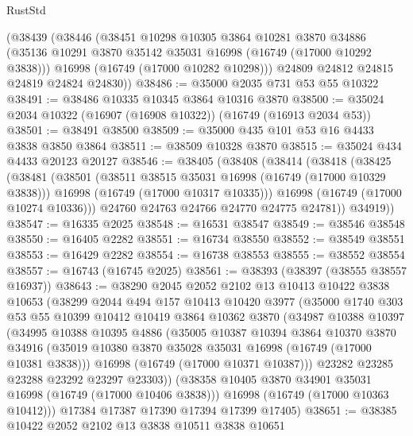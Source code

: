 \begin{lexlean}{RustStd}
\begin{coremodule}
    (@38439
      (@38446
        (@38451
          @10298
          @10305
          @3864
          @10281
          @3870
          @34886
          (@35136 @10291 @3870 @35142 @35031 @16998 (@16749 (@17000 @10292 @3838)))
          @16998
          (@16749 (@17000 @10282 @10298)))
        @24809
        @24812
        @24815
        @24819
        @24824
        @24830))
@38486 := @35000 @2035 @731 @53 @55 @10322
@38491 := @38486 @10335 @10345 @3864 @10316 @3870
@38500 := @35024 @2034 @10322 (@16907 (@16908 @10322)) (@16749 (@16913 @2034 @53))
@38501 := @38491 @38500
@38509 := @35000 @435 @101 @53 @16 @4433 @3838 @3850 @3864
@38511 := @38509 @10328 @3870
@38515 := @35024 @434 @4433 @20123 @20127
@38546 := @38405
    (@38408
      (@38414
        (@38418
          (@38425
            (@38481
              (@38501
                (@38511 @38515 @35031 @16998 (@16749 (@17000 @10329 @3838)))
                @16998
                (@16749 (@17000 @10317 @10335)))
              @16998
              (@16749 (@17000 @10274 @10336)))
            @24760
            @24763
            @24766
            @24770
            @24775
            @24781))
        @34919))
@38547 := @16335 @2025
@38548 := @16531 @38547
@38549 := @38546 @38548
@38550 := @16405 @2282
@38551 := @16734 @38550
@38552 := @38549 @38551
@38553 := @16429 @2282
@38554 := @16738 @38553
@38555 := @38552 @38554
@38557 := @16743 (@16745 @2025)
@38561 := @38393 (@38397 (@38555 @38557 @16937))
@38643 := @38290
    @2045
    @2052
    @2102
    @13
    @10413
    @10422
    @3838
    @10653
    (@38299
      @2044
      @494
      @157
      @10413
      @10420
      @3977
      (@35000
        @1740
        @303
        @53
        @55
        @10399
        @10412
        @10419
        @3864
        @10362
        @3870
        (@34987
          @10388
          @10397
          (@34995
            @10388
            @10395
            @4886
            (@35005
              @10387
              @10394
              @3864
              @10370
              @3870
              @34916
              (@35019 @10380 @3870 @35028 @35031 @16998 (@16749 (@17000 @10381 @3838)))
              @16998
              (@16749 (@17000 @10371 @10387)))
            @23282
            @23285
            @23288
            @23292
            @23297
            @23303))
        (@38358 @10405 @3870 @34901 @35031 @16998 (@16749 (@17000 @10406 @3838)))
        @16998
        (@16749 (@17000 @10363 @10412)))
      @17384
      @17387
      @17390
      @17394
      @17399
      @17405)
@38651 := @38385 @10422 @2052 @2102 @13 @3838 @10511 @3838 @10651

\end{coremodule}
\end{lexlean}
